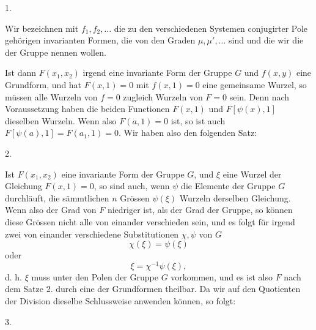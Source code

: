 
1.~

Wir bezeichnen mit $f_1, f_2, \ldots$ die zu den verschiedenen
Systemen conjugirter Pole gehörigen invarianten Formen, die
von den Graden $\mu, \mu', \ldots$ sind und die wir die 
der Gruppe nennen wollen.

Ist dann $F(x_1, x_2)$ irgend eine invariante Form der
Gruppe $G$ und $f(x, y)$ eine Grundform, und hat $F(x, 1) = 0$
mit $f(x, 1) = 0$ eine gemeinsame Wurzel, so müssen alle Wurzeln
 von $f = 0$ zugleich Wurzeln von $F = 0$ sein. Denn
nach Voraussetzung haben die beiden Functionen $F(x, 1)$ und
$F[\psi(x), 1]$ dieselben Wurzeln. Wenn also $F(a, 1) = 0$ ist,
so ist auch $F[\psi(a), 1] = F(a_1, 1) = 0$. Wir haben also den
folgenden Satz:

2.~

Ist $F(x_1, x_2)$ eine invariante Form der Gruppe $G$, und $\xi$
eine Wurzel der Gleichung $F(x, 1) = 0$, so sind auch, wenn
$\psi$ die Elemente der Gruppe $G$ durchläuft, die sämmtlichen
$n$ Grössen $\psi(\xi)$ Wurzeln derselben Gleichung. Wenn also der
Grad von $F$ niedriger ist, als der Grad der Gruppe, so können
diese Grössen nicht alle von einander verschieden sein, und es
folgt für irgend zwei von einander verschiedene Substitutionen
$\chi, \psi$ von $G$
\[
\chi(\xi) = \psi(\xi)
\]
oder
\[
\xi = \chi^{-1}\psi(\xi),
\]
d. h. $\xi$ muss unter den Polen der Gruppe $G$ vorkommen, und
es ist also $F$ nach dem Satze 2. durch eine der Grundformen
theilbar. Da wir auf den Quotienten der Division dieselbe Schlussweise
 anwenden können, so folgt:

3.~
